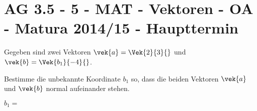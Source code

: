 \section{AG 3.5 - 5 - MAT - Vektoren - OA - Matura 2014/15 - Haupttermin}

\begin{beispiel}[AG 3.5]{1} %
Gegeben sind zwei Vektoren $\vek{a}=\Vek{2}{3}{}$ und $\vek{b}=\Vek{b_1}{-4}{}$. \leer

Bestimme die unbekannte Koordinate $b_1$ so, dass die beiden Vektoren $\vek{a}$ und $\vek{b}$ normal aufeinander stehen. \leer

$b_1=$ 

\end{beispiel}